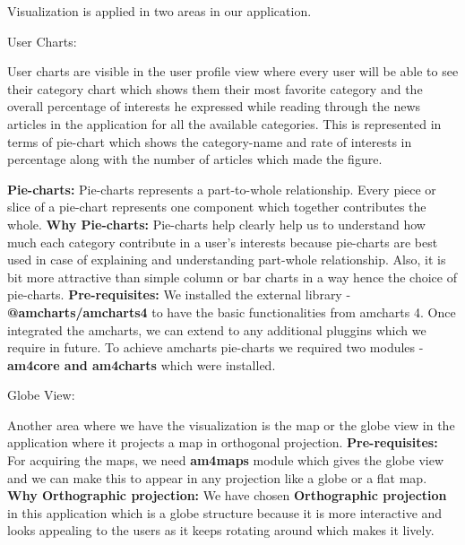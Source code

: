 Visualization is applied in two areas in our application. 
\begin{enumerate}
    {\bf \item User Charts:}
     User charts are visible in the user profile view where every user will be able to see their category chart which shows them their most favorite category and the overall percentage of interests he expressed while reading through the news articles in the application for all the available categories.\newline
     This is represented in terms of pie-chart which shows the category-name and rate of interests in percentage along with the number of articles which made the figure.
     
    \textbf{Pie-charts:}
    Pie-charts represents a part-to-whole relationship. Every piece or slice of a pie-chart represents one component which together contributes the whole\cite{amcharts_2018}.\newline
    \textbf{Why Pie-charts:}
    Pie-charts help clearly help us to understand how much each category contribute in a user's interests because pie-charts are best used in case of explaining and understanding part-whole relationship. Also, it is bit more attractive than simple column or bar charts in a way hence the choice of pie-charts.\newline
   \textbf{ Pre-requisites:}
   We installed the external library -\textbf{ @amcharts/amcharts4} to have the basic functionalities from amcharts 4.
   Once integrated the amcharts, we can extend to any additional pluggins which we require in future.\newline
   To achieve amcharts pie-charts we required two modules - \textbf{am4core and am4charts} which were installed.
   
     {\bf \item Globe View:}
     Another area where we have the visualization is the map or the globe view in the application where it projects a map in orthogonal projection.\newline
     \textbf{ Pre-requisites:}
      For acquiring the maps, we need \textbf{am4maps} module which gives the globe view and we can make this to appear in any projection like a globe or a flat map.\newline
      \textbf{Why Orthographic projection:}
      We have chosen \textbf{Orthographic projection }in this application which is a globe structure because it is more interactive and looks appealing to the users as it keeps rotating around which makes it lively.\newline
      

\end{enumerate}
